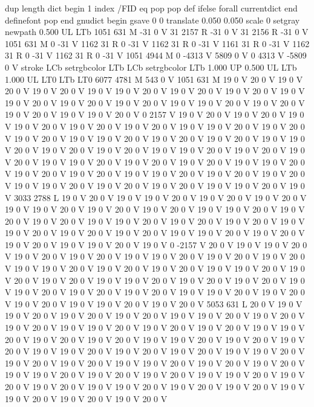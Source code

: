{{{{{dup length dict begin {1 index /FID eq {pop pop} {def} ifelse} forall
currentdict end definefont pop
end
gnudict begin
gsave
0 0 translate
0.050 0.050 scale
0 setgray
newpath
0.500 UL
LTb
1051 631 M
-31 0 V
31 2157 R
-31 0 V
31 2156 R
-31 0 V
1051 631 M
0 -31 V
1162 31 R
0 -31 V
1162 31 R
0 -31 V
1161 31 R
0 -31 V
1162 31 R
0 -31 V
1162 31 R
0 -31 V
1051 4944 M
0 -4313 V
5809 0 V
0 4313 V
-5809 0 V
stroke
LCb setrgbcolor
LTb
LCb setrgbcolor
LTb
1.000 UP
0.500 UL
LTb
1.000 UL
LT0
LTb
LT0
6077 4781 M
543 0 V
1051 631 M
19 0 V
20 0 V
19 0 V
20 0 V
19 0 V
20 0 V
19 0 V
19 0 V
20 0 V
19 0 V
20 0 V
19 0 V
20 0 V
19 0 V
19 0 V
20 0 V
19 0 V
20 0 V
19 0 V
20 0 V
19 0 V
19 0 V
20 0 V
19 0 V
20 0 V
19 0 V
20 0 V
19 0 V
19 0 V
20 0 V
0 2157 V
19 0 V
20 0 V
19 0 V
20 0 V
19 0 V
19 0 V
20 0 V
19 0 V
20 0 V
19 0 V
20 0 V
19 0 V
19 0 V
20 0 V
19 0 V
20 0 V
19 0 V
20 0 V
19 0 V
19 0 V
20 0 V
19 0 V
20 0 V
19 0 V
20 0 V
19 0 V
19 0 V
20 0 V
19 0 V
20 0 V
19 0 V
20 0 V
19 0 V
19 0 V
20 0 V
19 0 V
20 0 V
19 0 V
20 0 V
19 0 V
19 0 V
20 0 V
19 0 V
20 0 V
19 0 V
20 0 V
19 0 V
19 0 V
20 0 V
19 0 V
20 0 V
19 0 V
20 0 V
19 0 V
19 0 V
20 0 V
19 0 V
20 0 V
19 0 V
20 0 V
19 0 V
19 0 V
20 0 V
19 0 V
20 0 V
19 0 V
20 0 V
19 0 V
19 0 V
20 0 V
19 0 V
3033 2788 L
19 0 V
20 0 V
19 0 V
19 0 V
20 0 V
19 0 V
20 0 V
19 0 V
20 0 V
19 0 V
19 0 V
20 0 V
19 0 V
20 0 V
19 0 V
20 0 V
19 0 V
19 0 V
20 0 V
19 0 V
20 0 V
19 0 V
20 0 V
19 0 V
19 0 V
20 0 V
19 0 V
20 0 V
19 0 V
20 0 V
19 0 V
19 0 V
20 0 V
19 0 V
20 0 V
19 0 V
20 0 V
19 0 V
19 0 V
20 0 V
19 0 V
20 0 V
19 0 V
20 0 V
19 0 V
19 0 V
20 0 V
19 0 V
0 -2157 V
20 0 V
19 0 V
19 0 V
20 0 V
19 0 V
20 0 V
19 0 V
20 0 V
19 0 V
19 0 V
20 0 V
19 0 V
20 0 V
19 0 V
20 0 V
19 0 V
19 0 V
20 0 V
19 0 V
20 0 V
19 0 V
20 0 V
19 0 V
19 0 V
20 0 V
19 0 V
20 0 V
19 0 V
20 0 V
19 0 V
19 0 V
20 0 V
19 0 V
20 0 V
19 0 V
20 0 V
19 0 V
19 0 V
20 0 V
19 0 V
20 0 V
19 0 V
20 0 V
19 0 V
19 0 V
20 0 V
19 0 V
20 0 V
19 0 V
20 0 V
19 0 V
19 0 V
20 0 V
19 0 V
20 0 V
5053 631 L
20 0 V
19 0 V
19 0 V
20 0 V
19 0 V
20 0 V
19 0 V
20 0 V
19 0 V
19 0 V
20 0 V
19 0 V
20 0 V
19 0 V
20 0 V
19 0 V
19 0 V
20 0 V
19 0 V
20 0 V
19 0 V
20 0 V
19 0 V
19 0 V
20 0 V
19 0 V
20 0 V
19 0 V
20 0 V
19 0 V
19 0 V
20 0 V
19 0 V
20 0 V
19 0 V
20 0 V
19 0 V
19 0 V
20 0 V
19 0 V
20 0 V
19 0 V
20 0 V
19 0 V
19 0 V
20 0 V
19 0 V
20 0 V
19 0 V
20 0 V
19 0 V
19 0 V
20 0 V
19 0 V
20 0 V
19 0 V
20 0 V
19 0 V
19 0 V
20 0 V
19 0 V
20 0 V
19 0 V
20 0 V
19 0 V
19 0 V
20 0 V
19 0 V
20 0 V
19 0 V
20 0 V
19 0 V
19 0 V
20 0 V
19 0 V
20 0 V
19 0 V
20 0 V
19 0 V
19 0 V
20 0 V
19 0 V
20 0 V
19 0 V
20 0 V
}}}}}
